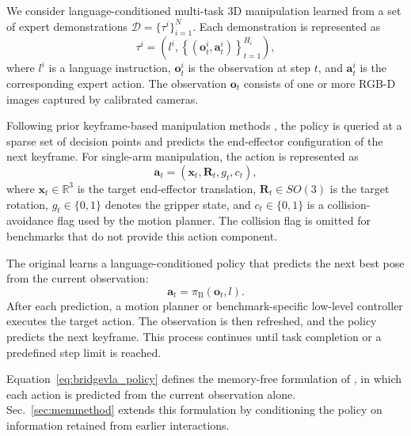 We consider language-conditioned multi-task 3D manipulation learned from a
set of expert demonstrations
$\mathcal{D}=\{\tau^i\}_{i=1}^{N}$.
Each demonstration is represented as
\begin{equation}
    \tau^i =
    \left(
        l^i,
        \left\{
            \left(\mathbf{o}_t^i,\mathbf{a}_t^i\right)
        \right\}_{t=1}^{H_i}
    \right),
\end{equation}
where $l^i$ is a language instruction,
$\mathbf{o}_t^i$ is the observation at step $t$, and
$\mathbf{a}_t^i$ is the corresponding expert action.
The observation $\mathbf{o}_t$ consists of one or more RGB-D images captured
by calibrated cameras.

Following prior keyframe-based manipulation methods
\cite{johns2021coarse,shridhar2023perceiver,goyal2023rvt},
the policy is queried at a sparse set of decision points and predicts the
end-effector configuration of the next keyframe.
For single-arm manipulation, the action is represented as
\begin{equation}
    \mathbf{a}_t =
    \left(
        \mathbf{x}_t,
        \mathbf{R}_t,
        g_t,
        c_t
    \right),
    \label{eq:action}
\end{equation}
where $\mathbf{x}_t\in\mathbb{R}^{3}$ is the target end-effector
translation, $\mathbf{R}_t\in SO(3)$ is the target rotation,
$g_t\in\{0,1\}$ denotes the gripper state, and
$c_t\in\{0,1\}$ is a collision-avoidance flag used by the motion planner.
The collision flag is omitted for benchmarks that do not provide this
action component.

The original \method learns a language-conditioned policy that predicts the
next best pose from the current observation:
\begin{equation}
    \mathbf{a}_t =
    \pi_{\mathrm{B}}
    \left(
        \mathbf{o}_t,l
    \right).
    \label{eq:bridgevla_policy}
\end{equation}
After each prediction, a motion planner or benchmark-specific low-level
controller executes the target action.
The observation is then refreshed, and the policy predicts the next
keyframe.
This process continues until task completion or a predefined step limit is
reached.

Equation~\eqref{eq:bridgevla_policy} defines the memory-free formulation of
\method, in which each action is predicted from the current observation
alone.
Sec.~\ref{sec:memmethod} extends this formulation by conditioning the
policy on information retained from earlier interactions.


